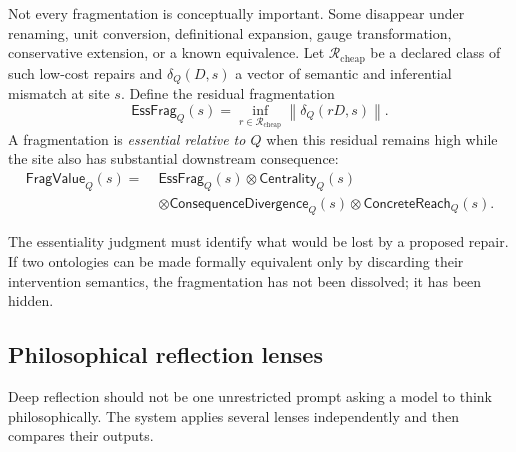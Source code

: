 \documentclass[11pt]{article}
\begin{document}
Not every fragmentation is conceptually important. Some disappear under renaming, unit conversion,
definitional expansion, gauge transformation, conservative extension, or a known equivalence.
Let $\mathcal{R}_{\mathrm{cheap}}$ be a declared class of such low-cost repairs and
$\delta_Q(D,s)$ a vector of semantic and inferential mismatch at site $s$. Define the residual
fragmentation
\begin{equation}
\mathsf{EssFrag}_Q(s)
=
\inf_{r\in\mathcal{R}_{\mathrm{cheap}}}
\left\lVert \delta_Q(rD,s)\right\rVert.
\label{eq:essential-fragmentation}
\end{equation}
A fragmentation is \emph{essential relative to $Q$} when this residual remains high while the site
also has substantial downstream consequence:
\begin{align}
\mathsf{FragValue}_Q(s)
=\;&\mathsf{EssFrag}_Q(s)
\otimes\mathsf{Centrality}_Q(s) \\
&\otimes\mathsf{ConsequenceDivergence}_Q(s)
\otimes\mathsf{ConcreteReach}_Q(s).
\end{align}

The essentiality judgment must identify what would be lost by a proposed repair. If two ontologies can
be made formally equivalent only by discarding their intervention semantics, the fragmentation has not
been dissolved; it has been hidden.

\subsection{Philosophical reflection lenses}

Deep reflection should not be one unrestricted prompt asking a model to think philosophically.
The system applies several lenses independently and then compares their outputs.
\end{document}
